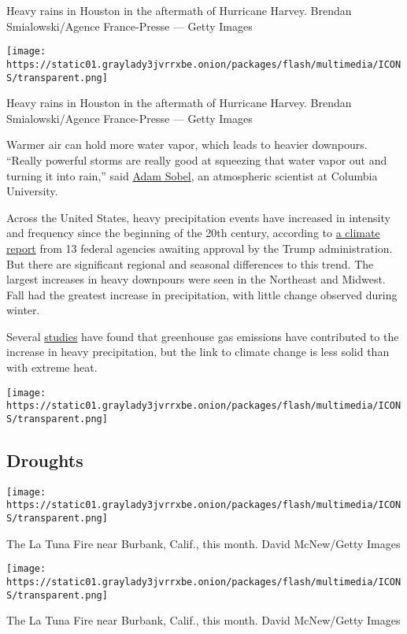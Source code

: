 Heavy rains in Houston in the aftermath of Hurricane Harvey. Brendan
Smialowski/Agence France-Presse --- Getty Images

\texttt{[image: https://static01.graylady3jvrrxbe.onion/packages/flash/multimedia/ICONS/transparent.png]}

Heavy rains in Houston in the aftermath of Hurricane Harvey. Brendan
Smialowski/Agence France-Presse --- Getty Images

Warmer air can hold more water vapor, which leads to heavier downpours.
``Really powerful storms are really good at squeezing that water vapor
out and turning it into rain,'' said
\href{http://eesc.columbia.edu/faculty/prof-adam-h-sobel}{Adam Sobel},
an atmospheric scientist at Columbia University.

Across the United States, heavy precipitation events have increased in
intensity and frequency since the beginning of the 20th century,
according to
\href{https://www.nytimes3xbfgragh.onion/interactive/2017/08/07/climate/document-Draft-of-the-Climate-Science-Special-Report.html}{a
climate report} from 13 federal agencies awaiting approval by the Trump
administration. But there are significant regional and seasonal
differences to this trend. The largest increases in heavy downpours were
seen in the Northeast and Midwest. Fall had the greatest increase in
precipitation, with little change observed during winter.

Several
\href{http://onlinelibrary.wiley.com/doi/10.1002/grl.51010/full}{studies}
have found that greenhouse gas emissions have contributed to the
increase in heavy precipitation, but the link to climate change is less
solid than with extreme heat.

\texttt{[image: https://static01.graylady3jvrrxbe.onion/packages/flash/multimedia/ICONS/transparent.png]}

\hypertarget{droughts}{%
\subsection{Droughts}\label{droughts}}

\texttt{[image: https://static01.graylady3jvrrxbe.onion/packages/flash/multimedia/ICONS/transparent.png]}

The La Tuna Fire near Burbank, Calif., this month. David McNew/Getty
Images

\texttt{[image: https://static01.graylady3jvrrxbe.onion/packages/flash/multimedia/ICONS/transparent.png]}

The La Tuna Fire near Burbank, Calif., this month. David McNew/Getty
Images

